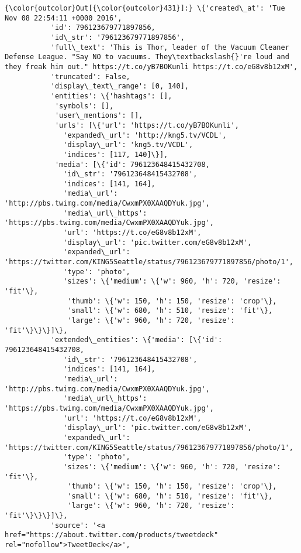 \documentclass[11pt]{article}
\begin{document}
\begin{Verbatim}[commandchars=\\\{\}]
{\color{outcolor}Out[{\color{outcolor}431}]:} \{'created\_at': 'Tue Nov 08 22:54:11 +0000 2016',
           'id': 796123679771897856,
           'id\_str': '796123679771897856',
           'full\_text': 'This is Thor, leader of the Vacuum Cleaner Defense League. "Say NO to vacuums. They\textbackslash{}'re loud and they freak him out." https://t.co/yB7BOKunli https://t.co/eG8v8b12xM',
           'truncated': False,
           'display\_text\_range': [0, 140],
           'entities': \{'hashtags': [],
            'symbols': [],
            'user\_mentions': [],
            'urls': [\{'url': 'https://t.co/yB7BOKunli',
              'expanded\_url': 'http://kng5.tv/VCDL',
              'display\_url': 'kng5.tv/VCDL',
              'indices': [117, 140]\}],
            'media': [\{'id': 796123648415432708,
              'id\_str': '796123648415432708',
              'indices': [141, 164],
              'media\_url': 'http://pbs.twimg.com/media/CwxmPX0XAAQDYuk.jpg',
              'media\_url\_https': 'https://pbs.twimg.com/media/CwxmPX0XAAQDYuk.jpg',
              'url': 'https://t.co/eG8v8b12xM',
              'display\_url': 'pic.twitter.com/eG8v8b12xM',
              'expanded\_url': 'https://twitter.com/KING5Seattle/status/796123679771897856/photo/1',
              'type': 'photo',
              'sizes': \{'medium': \{'w': 960, 'h': 720, 'resize': 'fit'\},
               'thumb': \{'w': 150, 'h': 150, 'resize': 'crop'\},
               'small': \{'w': 680, 'h': 510, 'resize': 'fit'\},
               'large': \{'w': 960, 'h': 720, 'resize': 'fit'\}\}\}]\},
           'extended\_entities': \{'media': [\{'id': 796123648415432708,
              'id\_str': '796123648415432708',
              'indices': [141, 164],
              'media\_url': 'http://pbs.twimg.com/media/CwxmPX0XAAQDYuk.jpg',
              'media\_url\_https': 'https://pbs.twimg.com/media/CwxmPX0XAAQDYuk.jpg',
              'url': 'https://t.co/eG8v8b12xM',
              'display\_url': 'pic.twitter.com/eG8v8b12xM',
              'expanded\_url': 'https://twitter.com/KING5Seattle/status/796123679771897856/photo/1',
              'type': 'photo',
              'sizes': \{'medium': \{'w': 960, 'h': 720, 'resize': 'fit'\},
               'thumb': \{'w': 150, 'h': 150, 'resize': 'crop'\},
               'small': \{'w': 680, 'h': 510, 'resize': 'fit'\},
               'large': \{'w': 960, 'h': 720, 'resize': 'fit'\}\}\}]\},
           'source': '<a href="https://about.twitter.com/products/tweetdeck" rel="nofollow">TweetDeck</a>',

\end{Verbatim}
\end{document}
